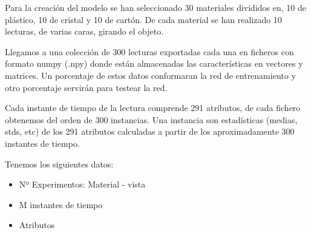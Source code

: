 Para la creación del modelo se han seleccionado 30 materiales divididos en, 10 de plástico, 10 de cristal y 10 de cartón. De cada material se han realizado 10 lecturas, de varias caras, girando el objeto.

Llegamos a una colección de 300 lecturas exportadas cada una en ficheros con formato numpy (.npy) donde están almacenadas las características en vectores y matrices. Un porcentaje de estos datos conformaran la red de entrenamiento y otro porcentaje servirán para testear la red.

Cada instante de tiempo de la lectura comprende 291 atributos, de cada fichero obtenemos del orden de 300 instancias.
Una instancia son estadísticas (medias, stds, etc) de los 291 atributos calculadas a partir de los aproximadamente 300 instantes de tiempo.

Tenemos los siguientes datos:
\begin{itemize}
\item Nº Experimentos: Material - vista
\item M instantes de tiempo
\item Atributos
\end{itemize}
